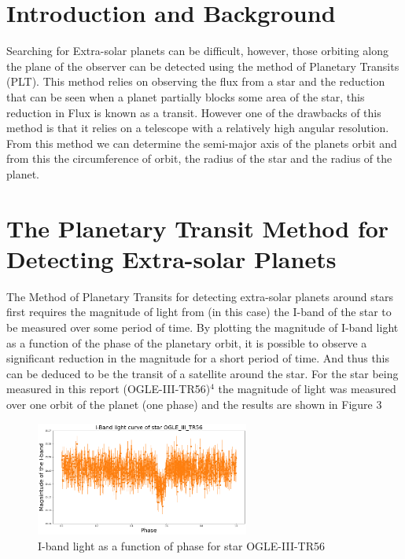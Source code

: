 \documentclass[]{article}
\begin{document}
\section*{Introduction and Background}
Searching for Extra-solar planets can be difficult, however, 
those orbiting along the plane of the observer can be 
detected using the method of Planetary Transits (PLT).
This method relies on observing the flux from a star and the 
reduction that can be seen when a planet partially blocks some 
area of the star, this reduction in Flux is known as a transit.
However one of the drawbacks of this method is that it relies on 
a telescope with a relatively high angular resolution. 
From this method we can determine the semi-major axis of the planets
orbit and from this the circumference of orbit, the radius of the star
and the radius of the planet.
\par



\section*{The Planetary Transit Method for Detecting Extra-solar Planets}
The Method of Planetary Transits for detecting extra-solar planets
around stars first requires
the magnitude of light from (in this case) the I-band of 
the star to be measured over some period of time.
By plotting the magnitude of I-band light as a 
function of the phase of the planetary orbit, it is 
possible to observe a significant reduction in the 
magnitude for a short period of time. And thus this can be 
deduced to be the transit of a satellite around the star.
For the star being measured in this report (OGLE-III-TR56)$^4$
the magnitude of light was measured over one orbit of the 
planet (one phase) and the results are shown in Figure 3

\begin{figure}[h]
  \includegraphics[width=7cm]{images/I-band_curve.png}
  \caption{I-band light as a function of phase for star OGLE-III-TR56}
  \label{fig:HD-_init}
  \end{figure}
\end{document}

